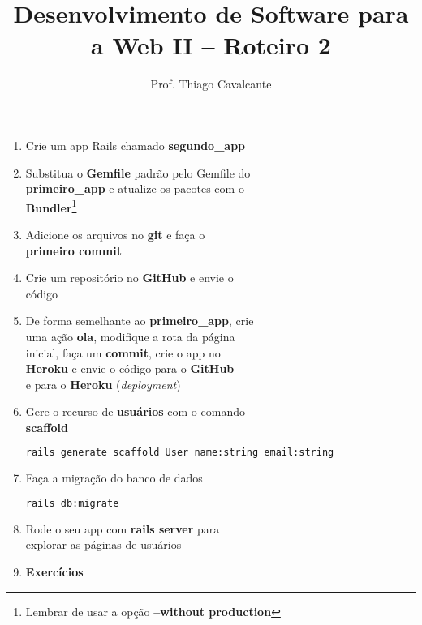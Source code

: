 \documentclass[a4paper,12pt]{article}
\title{Desenvolvimento de Software para a Web II -- Roteiro 2}
\author{Prof. Thiago Cavalcante}
\date{}
\begin{document}
\maketitle

\begin{enumerate}
  \item Crie um app Rails chamado \textbf{segundo\_app}
  \item Substitua o \textbf{Gemfile} padrão pelo Gemfile do \\
        \textbf{primeiro\_app} e atualize os pacotes com o \\
        \textbf{Bundler}\footnote{Lembrar de usar a opção \textbf{--without production}}
  \item Adicione os arquivos no \textbf{git} e faça o \\
        \textbf{primeiro commit}
  \item Crie um repositório no \textbf{GitHub} e envie o \\
        código
  \item De forma semelhante ao \textbf{primeiro\_app}, crie \\
        uma ação \textbf{ola}, modifique a rota da página \\
        inicial, faça um \textbf{commit}, crie o app no \\
        \textbf{Heroku} e envie o código para o \textbf{GitHub} \\
        e para o \textbf{Heroku} (\textit{deployment})
  \item Gere o recurso de \textbf{usuários} com o comando \\
        \textbf{scaffold}

    \begin{lstlisting}[language=Bash, basicstyle=\fontsize{9.8}{12}\selectfont\ttfamily]
rails generate scaffold User name:string email:string
    \end{lstlisting}

  \item Faça a migração do banco de dados

    \begin{lstlisting}[language=Bash]
rails db:migrate
    \end{lstlisting}

  \item Rode o seu app com \textbf{rails server} para \\
        explorar as páginas de usuários

  \item \textbf{Exercícios}


\end{enumerate}
\end{document}
